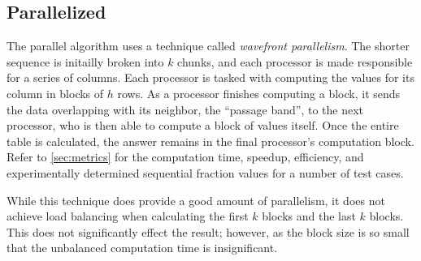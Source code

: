 \subsection{Parallelized}
The parallel algorithm uses a technique called \textit{wavefront
  parallelism}. The shorter sequence is initailly broken into $ k $
chunks, and each processor is made responsible for a series of
columns. Each processor is tasked with computing the values for its
column in blocks of $h$ rows. As a processor finishes computing a
block, it sends the data overlapping with its neighbor, the ``passage
band'', to the next processor, who is then able to compute a block of
values itself. Once the entire table is calculated, the answer remains
in the final processor's computation block. Refer to \ref{sec:metrics}
for the computation time, speedup, efficiency, and experimentally
determined sequential fraction values for a number of test cases.

While this technique does provide a good amount of parallelism, it
does not achieve load balancing when calculating the first $ k $
blocks and the last $ k $ blocks. This does not significantly effect
the result; however, as the block size is so small that the unbalanced
computation time is insignificant.


